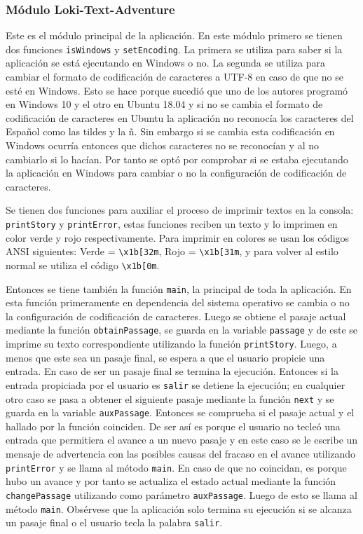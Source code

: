 \documentclass[12pt]{article}
\begin{document}
\subsubsection{Módulo Loki-Text-Adventure}

Este es el m\'odulo principal de la aplicaci\'on. En este m\'odulo primero se tienen dos funciones \verb|isWindows| y \verb|setEncoding|. La primera se utiliza para saber si la aplicaci\'on se est\'a ejecutando en Windows o no. La segunda se utiliza para cambiar el formato de codificaci\'on de caracteres a UTF-8 en caso de que no se esté en Windows. Esto se hace porque sucedió que uno de los autores program\'o en Windows 10 y el otro en Ubuntu 18.04 y si no se cambia el formato de codificaci\'on de caracteres en Ubuntu la aplicaci\'on no reconoc\'ia los caracteres del Español como las tildes y la ñ. Sin embargo si se cambia esta codificaci\'on en Windows ocurr\'ia entonces que dichos caracteres no se reconoc\'ian y al no cambiarlo si lo hac\'ian. Por tanto se opt\'o por comprobar si se estaba ejecutando la aplicaci\'on en Windows para cambiar o no la configuraci\'on de codificaci\'on de caracteres.

Se tienen dos funciones para auxiliar el proceso de imprimir textos en la consola: \verb|printStory| y \verb|printError|, estas funciones reciben un texto y lo imprimen en color verde y rojo respectivamente. Para imprimir en colores se usan los códigos ANSI siguientes: Verde = \verb|\x1b[32m|, Rojo = \verb|\x1b[31m|, y para volver al estilo normal se utiliza el código \verb|\x1b[0m|.

Entonces se tiene tambi\'en la funci\'on \verb|main|, la principal de toda la aplicaci\'on. En esta funci\'on primeramente en dependencia del sistema operativo se cambia o no la configuraci\'on de codificaci\'on de caracteres. Luego se obtiene el pasaje actual mediante la funci\'on \verb|obtainPassage|, se guarda en la variable \verb|passage| y de este se imprime su texto correspondiente utilizando la función \verb|printStory|. Luego, a menos que este sea un pasaje final, se espera a que el usuario propicie una entrada. En caso de ser un pasaje final se termina la ejecuci\'on. Entonces si la entrada propiciada por el usuario es \verb|salir| se detiene la ejecuci\'on; en cualquier otro caso se pasa a obtener el siguiente pasaje mediante la funci\'on \verb|next| y se guarda en la variable \verb|auxPassage|. Entonces se comprueba si el pasaje actual y el hallado por la funci\'on coinciden. De ser as\'i es porque el usuario no tecleó una entrada que permitiera el avance a un nuevo pasaje y en este caso se le escribe un mensaje de advertencia con las posibles causas del fracaso en el avance utilizando \verb|printError| y se llama al m\'etodo \verb|main|. En caso de que no coincidan, es porque hubo un avance y por tanto se actualiza el estado actual mediante la funci\'on \verb|changePassage| utilizando como par\'ametro \verb|auxPassage|. Luego de esto se llama al m\'etodo \verb|main|. Obs\'ervese que la aplicaci\'on solo termina su ejecuci\'on si se alcanza un pasaje final o el usuario tecla la palabra \verb|salir|.   
\end{document}
